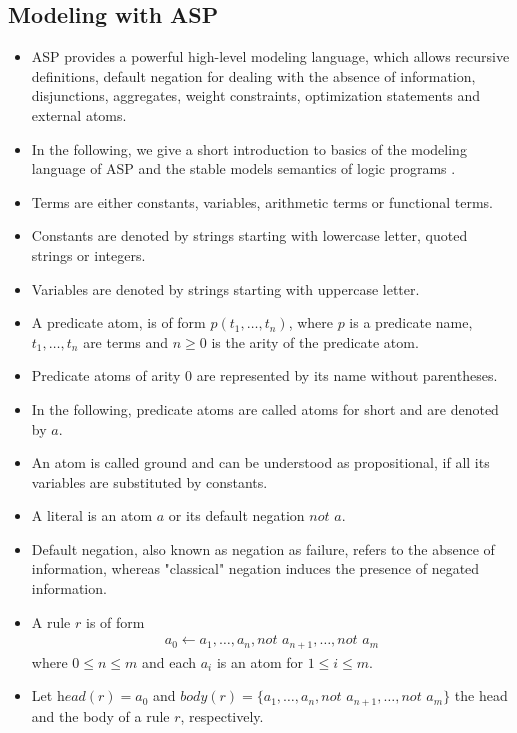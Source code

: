 \documentclass{easychair}
\newcommand{\ASP}{ASP}
\newcommand{\naf}{\textit{not }}
\newcommand{\head}{\textit{head}}
\newcommand{\body}{\textit{body}}
\begin{document}
\subsection{Modeling with \ASP{}}
\label{subsec:asp}
\begin{itemize}%
  \item%
  \ASP{} provides a powerful high-level modeling language, which allows recursive definitions, default negation for dealing with the absence of information, disjunctions, aggregates, weight constraints, optimization statements and external atoms. 
  \item%
  In the following, we give a short introduction to basics of the modeling language of \ASP{} \cite{cafageiakakrlemarisc19a} and the stable models semantics of logic programs \cite{gellif88b}. \\
  \item%
  Terms are either constants, variables, arithmetic terms or functional terms. 
  \item%
  Constants are denoted by strings starting with lowercase letter, quoted strings or integers. 
  \item%
  Variables are denoted by strings starting with uppercase letter. 
  \item%
  A predicate atom, is of form $p(t_1,\dots,t_n)$, where $p$ is a predicate name, $t_1,\dots,t_n$ are terms and $n\geq0$ is the arity of the predicate atom. 
  \item%
  Predicate atoms of arity $0$ are represented by its name without parentheses.
  \item%
  In the following, predicate atoms are called atoms for short and are denoted by $a$.
  \item%
  An atom is called ground and can be understood as propositional, if all its variables are substituted by constants. 
  \item%
  A literal is an atom $a$ or its default negation $\naf{} a$. 
  \item%
  Default negation, also known as negation as failure, refers to the absence of information, whereas "classical" negation induces the presence of negated information.  
  \item%
  A rule $r$ is of form 
  \begin{align*}
    a_0 \leftarrow a_1,\dots,a_n, \naf{} a_{n+1},\dots,\naf{} a_m
  \end{align*}
  where $0\leq n\leq m$ and each $a_i$ is an atom for $1\leq i \leq m$. 
  \item%
  Let $\head{(r)} = a_0$ and $\body{(r)} = \{a_1,\dots,a_n,\naf{} a_{n+1},\dots,\naf{} a_m\}$ the head and the body of a rule $r$, respectively. 

\end{itemize}
\end{document}
